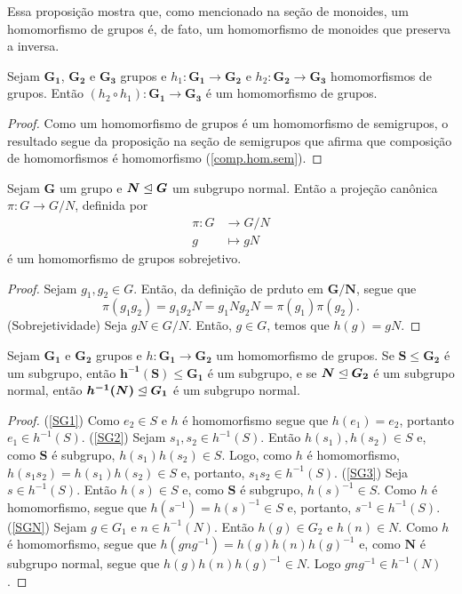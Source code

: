 	Essa proposição mostra que, como mencionado na seção de monoides, um homomorfismo de grupos é, de fato, um homomorfismo de monoides que preserva a inversa.

\begin{coro}
\label{comp.hom.gru}
Sejam $\bm{G_1}$, $\bm{G_2}$ e $\bm{G_3}$ grupos e $h_1: \bm{G_1} \to \bm{G_2}$ e $h_2: \bm{G_2} \to \bm{G_3}$ homomorfismos de grupos. Então $(h_2 \circ h_1): \bm{G_1} \to \bm{G_3}$ é um homomorfismo de grupos.
\end{coro}
\begin{proof}
Como um homomorfismo de grupos é um homomorfismo de semigrupos, o resultado segue da proposição na seção de semigrupos que afirma que composição de homomorfismos é homomorfismo (\ref{comp.hom.sem}).
\end{proof}

\begin{prop}
Sejam $\bm G$ um grupo e $\bm N \mathrel{\unlhd} \bm G$ um subgrupo normal. Então a projeção canônica $\pi: G \to G/N$, definida por
	\begin{align*}
	\pi: G &\to G/N \\
		g &\mapsto gN
	\end{align*}
é um homomorfismo de grupos sobrejetivo.
\end{prop}
\begin{proof}
Sejam $g_1,g_2 \in G$. Então, da definição de prduto em $\bm{G/N}$, segue que
	\begin{equation*}
	\pi(g_1g_2) = g_1g_2N = g_1Ng_2N = \pi(g_1)\pi(g_2).
	\end{equation*}
(Sobrejetividade) Seja $gN \in G/N$. Então, $g \in G$, temos que $h(g)=gN$.
\end{proof}

\begin{prop}
\label{alge:prop.gru.hominv}
Sejam $\bm{G_1}$ e $\bm{G_2}$ grupos e $h: \bm{G_1} \to \bm{G_2}$ um homomorfismo de grupos. Se $\bm S \leq \bm{G_2}$ é um subgrupo, então $\bm{h^{-1}(S)} \leq \bm{G_1}$ é um subgrupo, e se $\bm N \mathrel{\unlhd} \bm{G_2}$ é um subgrupo normal, então $\bm{h^{-1}(N)} \mathrel{\unlhd} \bm{G_1}$ é um subgrupo normal.
\end{prop}
\begin{proof}
(\ref{SG1}) Como $e_2 \in S$ e $h$ é homomorfismo segue que $h(e_1)=e_2$, portanto $e_1 \in h^{-1}(S)$.
(\ref{SG2}) Sejam $s_1,s_2 \in h^{-1}(S)$. Então $h(s_1),h(s_2) \in S$ e, como $\bm S$ é subgrupo, $h(s_1)h(s_2) \in S$. Logo, como $h$ é homomorfismo, $h(s_1s_2) = h(s_1)h(s_2) \in S$ e, portanto, $s_1s_2 \in h^{-1}(S)$.
(\ref{SG3}) Seja $s \in h^{-1}(S)$. Então $h(s) \in S$ e, como $\bm S$ é subgrupo, $h(s)^{-1} \in S$. Como $h$ é homomorfismo, segue que $h(s^{-1})=h(s)^{-1} \in S$ e, portanto, $s^{-1} \in h^{-1}(S)$.  
(\ref{SGN}) Sejam $g \in G_1$ e $n \in h^{-1}(N)$. Então $h(g) \in G_2$ e $h(n) \in N$. Como $h$ é homomorfismo, segue que $h(gng^{-1})=h(g)h(n)h(g)^{-1}$ e, como $\bm N$ é subgrupo normal, segue que $h(g)h(n)h(g)^{-1} \in N$. Logo $gng^{-1} \in h^{-1}(N)$.
\end{proof}

